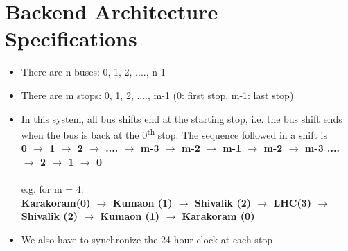 \section{Backend Architecture Specifications}

\begin{itemize}
    \item There are n buses: 0, 1, 2, ...., n-1
    \item There are m stops: 0, 1, 2, ...., m-1  (0: first stop, m-1: last stop)
    \item In this system, all bus shifts end at the starting stop, i.e. the bus shift ends when the bus is back at the 0\textsuperscript{th} stop. The sequence followed in a shift is \\
    {\bfseries0 $\to$ 1 $\to$ 2 $\to$ .... $\to$ m-3 $\to$ m-2 $\to$ m-1 $\to$ m-2 $\to$ m-3 .... $\to$ 2 $\to$ 1 $\to$ 0}\\\\
    e.g. for m = 4: \\
    {\bfseries Karakoram(0) $\to$ Kumaon (1) $\to$ Shivalik (2) $\to$ LHC(3) $\to$ Shivalik (2) $\to$ Kumaon (1) $\to$ Karakoram (0)}
    \item We also have to synchronize the 24-hour clock at each stop
\end{itemize}

    
    